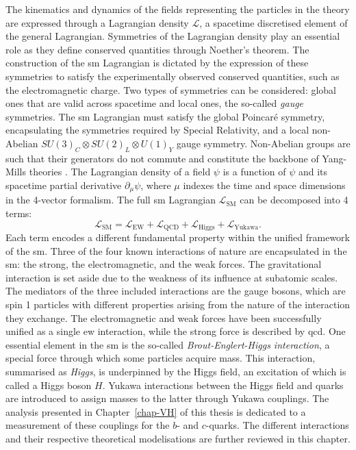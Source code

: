 The kinematics and dynamics of the fields representing the particles in the theory are expressed through a Lagrangian density $\mathcal{L}$, a spacetime discretised element of the general Lagrangian. Symmetries of the Lagrangian density play an essential role as they define conserved quantities through Noether's theorem. The construction of the \gls{sm} Lagrangian is dictated by the expression of these symmetries to satisfy the experimentally observed conserved quantities, such as the electromagnetic charge. Two types of symmetries can be considered: global ones that are valid across spacetime and local ones, the so-called \textit{gauge} symmetries. The \gls{sm} Lagrangian must satisfy the global Poincaré symmetry, encapsulating the symmetries required by Special Relativity, and a local non-Abelian $SU(3)_C \otimes SU(2)_L \otimes U(1)_Y$ gauge symmetry. Non-Abelian groups are such that their generators do not commute and constitute the backbone of Yang-Mills theories \cite{PhysRev.96.191}. The Lagrangian density of a field $\psi$ is a function of $\psi$ and its spacetime partial derivative $\partial_{\mu} \psi$, where $\mu$ indexes the time and space dimensions in the 4-vector formalism. The full \gls{sm} Lagrangian $\mathcal{L}_{\text{SM}}$ can be decomposed into 4 terms:
\begin{equation}\label{eq-SMGlobal}
    \mathcal{L}_{\text{SM}} = \mathcal{L}_{\text{EW}} + \mathcal{L}_{\text{QCD}} + \mathcal{L}_{\text{Higgs}} + \mathcal{L}_{\text{Yukawa}}.
\end{equation}
Each term encodes a different fundamental property within the unified framework of the \gls{sm}. Three of the four known interactions of nature are encapsulated in the \gls{sm}: the strong, the electromagnetic, and the weak forces. The gravitational interaction is set aside due to the weakness of its influence at subatomic scales. The mediators of the three included interactions are the gauge bosons, which are spin 1 particles with different properties arising from the nature of the interaction they exchange. The electromagnetic and weak forces have been successfully unified as a single \gls{ew} interaction, while the strong force is described by \gls{qcd}. One essential element in the \gls{sm} is the so-called \textit{Brout-Englert-Higgs interaction}, a special force through which some particles acquire mass. This interaction, summarised as \textit{Higgs}, is underpinned by the Higgs field, an excitation of which is called a Higgs boson $H$. Yukawa interactions between the Higgs field and quarks are introduced to assign masses to the latter through Yukawa couplings. The analysis presented in Chapter~\ref{chap-VH} of this thesis is dedicated to a measurement of these couplings for the $b$- and $c$-quarks. The different interactions and their respective theoretical modelisations are further reviewed in this chapter.

